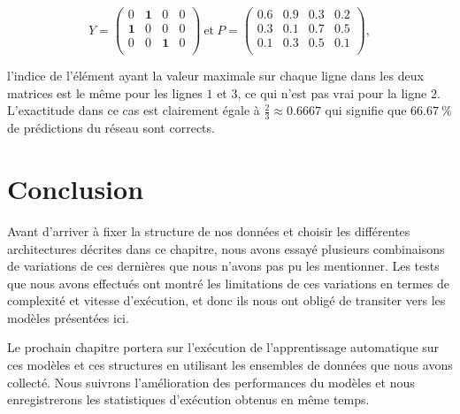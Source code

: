 $$
Y =
\begin{pmatrix}
  0 & \mathbf{1} & 0 & 0\\
  \mathbf{1} & 0 & 0 & 0\\
  0 & 0 & \mathbf{1} & 0\\
\end{pmatrix}
~
\mathrm{et}
~
P =
\begin{pmatrix}
  0.6 & \mathbf{0.9} & 0.3 & 0.2\\
  0.3 & 0.1 & \mathbf{0.7} & 0.5\\
  0.1 & 0.3 & \mathbf{0.5} & 0.1\\
\end{pmatrix},
$$

l'indice de l'élément ayant la valeur maximale sur chaque ligne dans les deux
matrices est le même pour les lignes $1$ et $3$, ce qui n'est pas vrai pour la
ligne $2$. L'exactitude dans ce cas est clairement égale à $\frac{2}{3} \approx 0.6667$
qui signifie que $66.67~\%$ de prédictions du réseau sont corrects.

\section{Conclusion}

Avant d'arriver à fixer la structure de nos données et choisir les différentes
architectures décrites dans ce chapitre, nous avons essayé plusieurs combinaisons
de variations de ces dernières que nous n'avons pas pu les mentionner.
Les tests que nous avons effectués ont montré les limitations de ces variations
en termes de complexité et vitesse d'exécution, et donc ils nous ont obligé de
transiter vers les modèles présentées ici.

Le prochain chapitre portera sur l'exécution de l'apprentissage automatique sur
ces modèles et ces structures en utilisant les ensembles de données que nous avons
collecté. Nous suivrons l'amélioration des performances du modèles et nous
enregistrerons les statistiques d'exécution obtenus en même temps.
